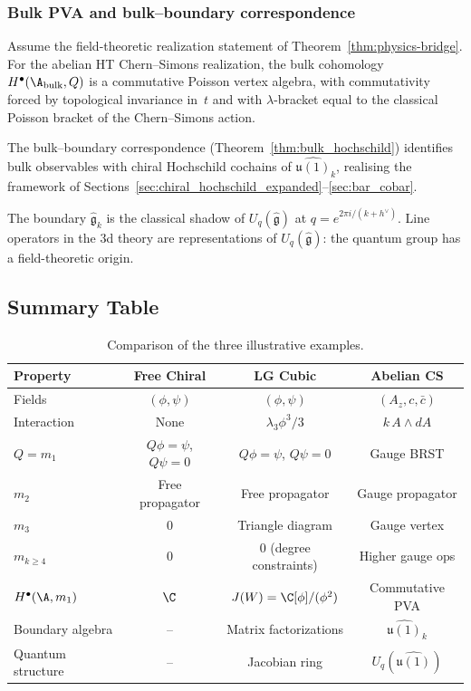 \subsubsection{Bulk PVA and bulk--boundary correspondence}

\begin{proposition}
Assume the field-theoretic realization statement of
Theorem~\ref{thm:physics-bridge}. For the abelian HT Chern--Simons
realization, the bulk cohomology $H^\bullet(\A_{\mathrm{bulk}}, Q)$ is
a commutative Poisson vertex algebra, with commutativity forced by
topological invariance in~$t$ and with $\lambda$-bracket equal to the
classical Poisson bracket of the Chern--Simons action.
\end{proposition}

The bulk--boundary correspondence (Theorem~\ref{thm:bulk_hochschild}) identifies bulk observables with chiral Hochschild cochains of $\widehat{\mathfrak{u}(1)}_k$, realising the framework of Sections~\ref{sec:chiral_hochschild_expanded}--\ref{sec:bar_cobar}.

\begin{remark}
The boundary $\widehat{\mathfrak{g}}_k$ is the classical shadow of $U_q(\widehat{\mathfrak{g}})$ at $q = e^{2\pi i/(k + h^\vee)}$. Line operators in the 3d theory are representations of $U_q(\widehat{\mathfrak{g}})$: the quantum group has a field-theoretic origin.
\end{remark}

\subsection{Summary Table}

\begin{table}[h]
\centering
\begin{tabular}{|l|c|c|c|}
\hline
\textbf{Property} & \textbf{Free Chiral} & \textbf{LG Cubic} & \textbf{Abelian CS} \\
\hline
Fields & $(\phi, \psi)$ & $(\phi, \psi)$ & $(A_z, c, \bar{c})$ \\
\hline
Interaction & None & $\lambda_3 \phi^3/3$ & $k\,A\wedge dA$ \\
\hline
$Q = m_1$ & $Q\phi=\psi$, $Q\psi=0$ & $Q\phi=\psi$, $Q\psi=0$ & Gauge BRST \\
\hline
$m_2$ & Free propagator & Free propagator & Gauge propagator \\
\hline
$m_3$ & $0$ & Triangle diagram & Gauge vertex \\
\hline
$m_{k\ge 4}$ & $0$ & $0$ (degree constraints) & Higher gauge ops \\
\hline
$H^\bullet(\A,m_1)$ & $\C$ & $J(W) = \C[\phi]/(\phi^2)$ & Commutative PVA \\
\hline
Boundary algebra & -- & Matrix factorizations & $\widehat{\mathfrak{u}(1)}_k$ \\
\hline
Quantum structure & -- & Jacobian ring & $U_q(\widehat{\mathfrak{u}(1)})$ \\
\hline
\end{tabular}
\caption{Comparison of the three illustrative examples.}
\label{tab:examples_summary}
\end{table}

